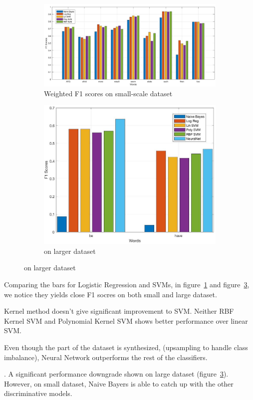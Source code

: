 \begin{figure}[t!]
    \centering
  \begin{subfigure}[t]{0.68\textwidth}
    \includegraphics[width=\textwidth]{plots/f1.jpg}
    \caption{Weighted F1 scores on small-scale dataset}
    \label{fig:results:f1}
\end{subfigure}
  \begin{subfigure}[t]{0.3\textwidth}
    \includegraphics[width=\textwidth]{plots/f1_large.jpg}
    \caption{on larger dataset}
    \label{fig:results:f1-large}
\end{subfigure}
\end{figure}

Comparing the bars for Logistic Regression and SVMs, in
figure~\ref{fig:results:f1} and figure~\ref{fig:results:f1-large},
we notice they yields close F1 socres on both small and large dataset.

Kernel method doesn't give significant improvement to SVM.
Neither RBF Kernel SVM and Polynomial Kernel SVM shows better performance over
linear SVM.

Even though the part of the dataset is synthesized, (upsampling to handle class
imbalance), Neural Network outperforms the rest of the classifiers.

.
A significant performance downgrade shown on large dataset
(figure~\ref{fig:results:f1-large}).
However, on small dataset, Naive Bayers is able to catch up with the other
discriminative models.

